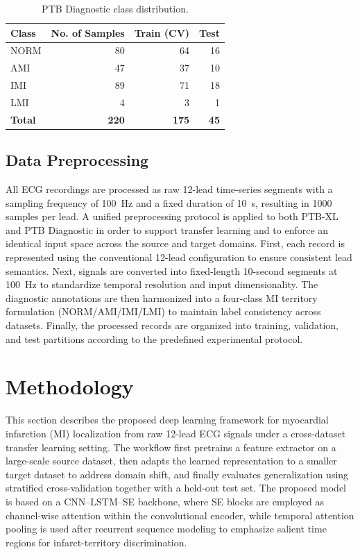 \documentclass[preprint,12pt]{elsarticle}
\begin{document}
\begin{table}[!t]
\centering
\caption{PTB Diagnostic class distribution.}
\label{tab:ptbdiag_split}
\begin{tabular}{l r r r}
\hline
\textbf{Class} & \textbf{No. of Samples} & \textbf{Train (CV)} & \textbf{Test} \\
\hline
NORM & 80 & 64 & 16 \\
AMI  & 47 & 37 & 10 \\
IMI  & 89 & 71 & 18 \\
LMI  & 4  & 3  & 1  \\
\hline
\textbf{Total} & \textbf{220} & \textbf{175} & \textbf{45} \\
\hline
\end{tabular}
\end{table}

\subsection{Data Preprocessing}
All ECG recordings are processed as raw 12-lead time-series segments with a sampling frequency of 100~Hz and a fixed duration of 10~s, resulting in 1000 samples per lead. A unified preprocessing protocol is applied to both PTB-XL and PTB Diagnostic in order to support transfer learning and to enforce an identical input space across the source and target domains. First, each record is represented using the conventional 12-lead configuration to ensure consistent lead semantics. Next, signals are converted into fixed-length 10-second segments at 100~Hz to standardize temporal resolution and input dimensionality. The diagnostic annotations are then harmonized into a four-class MI territory formulation (NORM/AMI/IMI/LMI) to maintain label consistency across datasets. Finally, the processed records are organized into training, validation, and test partitions according to the predefined experimental protocol.


\section{Methodology}
This section describes the proposed deep learning framework for myocardial infarction (MI) localization from raw 12-lead ECG signals under a cross-dataset transfer learning setting. The workflow first pretrains a feature extractor on a large-scale source dataset, then adapts the learned representation to a smaller target dataset to address domain shift, and finally evaluates generalization using stratified cross-validation together with a held-out test set. The proposed model is based on a CNN--LSTM--SE backbone, where SE blocks are employed as channel-wise attention within the convolutional encoder, while temporal attention pooling is used after recurrent sequence modeling to emphasize salient time regions for infarct-territory discrimination.
\end{document}
